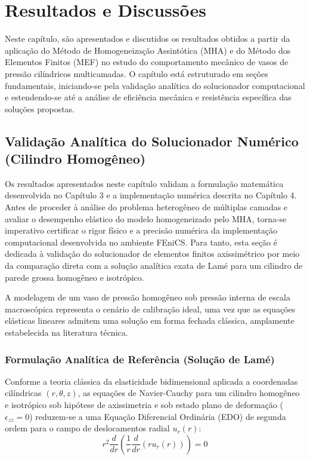 \chapter{Resultados e Discussões}\label{cap:resultados}

Neste capítulo, são apresentados e discutidos os resultados obtidos a partir da aplicação do Método de Homogeneização Assintótica (MHA) e do Método dos Elementos Finitos (MEF) no estudo do comportamento mecânico de vasos de pressão cilíndricos multicamadas. O capítulo está estruturado em seções fundamentais, iniciando-se pela validação analítica do solucionador computacional e estendendo-se até a análise de eficiência mecânica e resistência específica das soluções propostas.

\section{Validação Analítica do Solucionador Numérico (Cilindro Homogêneo)}\label{sec:validacao_homogeneo}


Os resultados apresentados neste capítulo validam a formulação matemática desenvolvida no Capítulo 3 e a implementação numérica descrita no Capítulo 4.
Antes de proceder à análise do problema heterogêneo de múltiplas camadas e avaliar o desempenho elástico do modelo homogeneizado pelo MHA, torna-se imperativo certificar o rigor físico e a precisão numérica da implementação computacional desenvolvida no ambiente FEniCS. Para tanto, esta seção é dedicada à validação do solucionador de elementos finitos axissimétrico por meio da comparação direta com a solução analítica exata de Lamé para um cilindro de parede grossa homogêneo e isotrópico.

A modelagem de um vaso de pressão homogêneo sob pressão interna de escala macroscópica representa o cenário de calibração ideal, uma vez que as equações elásticas lineares admitem uma solução em forma fechada clássica, amplamente estabelecida na literatura técnica.

\subsection{Formulação Analítica de Referência (Solução de Lamé)}

Conforme a teoria clássica da elasticidade bidimensional aplicada a coordenadas cilíndricas $(r, \theta, z)$, as equações de Navier-Cauchy para um cilindro homogêneo e isotrópico sob hipótese de axissimetria e sob estado plano de deformação ($\epsilon_{zz} = 0$) reduzem-se a uma Equação Diferencial Ordinária (EDO) de segunda ordem para o campo de deslocamentos radial $u_r (r)$:
\begin{equation}
  r^2 \frac{d}{d r} \left(\frac{1}{r} \frac{d}{d r} (r u_r (r))\right) = 0
  \label{eq:edo_lame_v3}
\end{equation}

